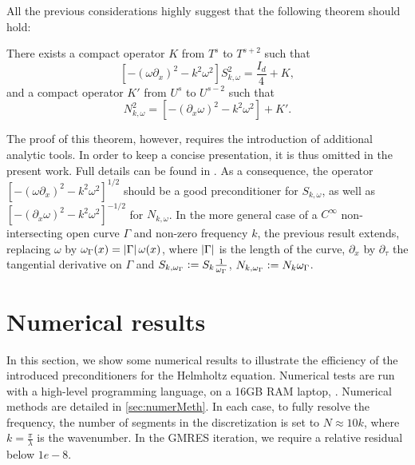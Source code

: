 \documentclass[a4paper]{article}
\begin{document}
	All the previous considerations highly suggest that the following theorem should hold:	
	\begin{The} 
		There exists a compact operator $K$ from $T^s$ to $T^{s+2}$ such that
		\[\left[-(\omega \partial_x)^2 - k^2\omega^2\right]S_{k,\omega}^2 = \frac{I_d}{4} + K, \]
		and a compact operator $K'$ from $U^s$ to $U^{s-2}$ such that
		\[N_{k,\omega}^2 = \left[-(\partial_x \omega)^2 - k^2 \omega^2\right] + K'.\]
	\end{The}
The proof of this theorem, however, requires the introduction of additional analytic tools. In order to keep a concise presentation, it is thus omitted in the present work. Full details can be found in \cite{}. As a consequence, the operator $\left[-(\omega \partial_x)^2 - k^2 \omega^2\right]^{1/2}$ should be a good preconditioner for $S_{k,\omega}$, as well as $\left[-(\partial_x \omega)^2 - k^2 \omega^2\right]^{-1/2}$ for $N_{k,\omega}$. 
In the more general case of a $C^{\infty}$ non-intersecting open curve $\Gamma$ and non-zero frequency $k$, the previous result extends, replacing $\omega$ by $\omega_\Gamma(x) = \left\lvert \Gamma \right\rvert \omega(x)$, where $\left\lvert \Gamma \right\rvert$ is the length of the curve, $\partial_x$ by $\partial_\tau$ the tangential derivative on $\Gamma$ and $S_{k,\omega_{\Gamma}} \mathrel{\mathop:}= S_k \frac{1}{\omega_\Gamma}$, $N_{k,\omega_{\Gamma}} \mathrel{\mathop:}= N_k \omega_\Gamma$. 

\section{Numerical results}
\label{sec:NumericalResutls}

In this section, we show some numerical results to illustrate the efficiency of the introduced preconditioners for the Helmholtz equation. Numerical tests are run with a high-level programming language, on a 16GB RAM laptop, . Numerical methods are detailed in \autoref{sec:numerMeth}. In each case, to fully resolve the frequency, the number of segments in the discretization is set to $N \approx 10k$, where $k = \frac{\pi}{\lambda}$ is the wavenumber. In the GMRES iteration, we require a relative residual below $1e-8$. 
\end{document}
